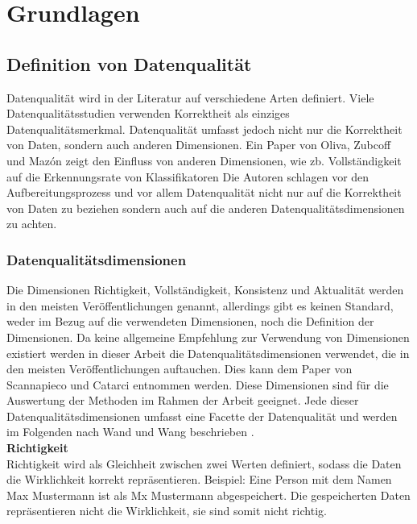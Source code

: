 \chapter{Grundlagen}\label{ch:data}

\section{Definition von Datenqualität}
Datenqualität wird in der Literatur auf verschiedene Arten definiert. 
Viele Datenqualitätsstudien verwenden Korrektheit als einziges Datenqualitätsmerkmal. \cite{wang1996}
Datenqualität umfasst jedoch nicht nur die Korrektheit von Daten, sondern auch anderen Dimensionen. 
Ein Paper von Oliva, Zubcoff und Mazón zeigt den Einfluss von anderen Dimensionen, wie zb. Vollständigkeit auf die Erkennungsrate von Klassifikatoren \cite{espinosaoliva2011} Die Autoren schlagen vor den Aufbereitungsprozess und vor allem Datenqualität nicht nur auf die Korrektheit von Daten zu beziehen sondern auch auf die anderen Datenqualitätsdimensionen zu achten.

\subsection{Datenqualitätsdimensionen}
\label{subsec:dimensionen}
Die Dimensionen Richtigkeit, Vollständigkeit, Konsistenz und Aktualität werden in den meisten Veröffentlichungen genannt, allerdings gibt es keinen Standard, weder im Bezug auf die verwendeten Dimensionen, noch die Definition der Dimensionen. \cite{scannapieco2002}
Da keine allgemeine Empfehlung zur Verwendung von Dimensionen existiert werden in dieser Arbeit die Datenqualitätsdimensionen verwendet, die in den meisten Veröffentlichungen auftauchen.
Dies kann dem Paper von Scannapieco und Catarci entnommen werden. 
Diese Dimensionen sind für die Auswertung der Methoden im Rahmen der Arbeit geeignet. 
Jede dieser Datenqualitätsdimensionen umfasst eine Facette der Datenqualität und werden im Folgenden nach Wand und Wang beschrieben \cite{wand1996}. \\

\textbf{Richtigkeit} \\
Richtigkeit wird als Gleichheit zwischen zwei Werten definiert, sodass die Daten die Wirklichkeit korrekt repräsentieren. 
Beispiel: Eine Person mit dem Namen Max Mustermann ist als Mx Mustermann abgespeichert. 
Die gespeicherten Daten repräsentieren nicht die Wirklichkeit, sie sind somit nicht richtig. \\

